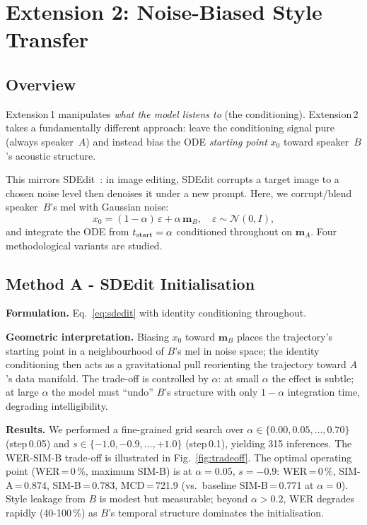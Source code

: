 \documentclass[11pt,a4paper,twocolumn]{article}
\begin{document}
\section{Extension 2: Noise-Biased Style Transfer}
\label{sec:ext2}

\subsection{Overview}

Extension\,1 manipulates \emph{what the model listens to} (the conditioning).
Extension\,2 takes a fundamentally different approach: leave the conditioning
signal pure (always speaker~$A$) and instead bias the ODE \emph{starting
point} $x_0$ toward speaker~$B$'s acoustic structure.

This mirrors SDEdit~\cite{song2022sdedit}: in image editing, SDEdit corrupts
a target image to a chosen noise level then denoises it under a new prompt.
Here, we corrupt/blend speaker~$B$'s mel with Gaussian noise:
\begin{equation}
  x_0 = (1-\alpha)\,\varepsilon + \alpha\,\mathbf{m}_B,
  \quad \varepsilon\sim\mathcal{N}(0,I),
  \label{eq:sdedit}
\end{equation}
and integrate the ODE from $t_{\rm start}=\alpha$ conditioned throughout
on $\mathbf{m}_A$.  Four methodological variants are studied.

\subsection{Method A - SDEdit Initialisation}

\textbf{Formulation.} Eq.~\eqref{eq:sdedit} with identity conditioning
throughout.

\textbf{Geometric interpretation.}  Biasing $x_0$ toward $\mathbf{m}_B$
places the trajectory's starting point in a neighbourhood of $B$'s mel in
noise space; the identity conditioning then acts as a gravitational pull
reorienting the trajectory toward $A$'s data manifold.  The trade-off is
controlled by $\alpha$: at small $\alpha$ the effect is subtle; at large
$\alpha$ the model must ``undo'' $B$'s structure with only $1-\alpha$
integration time, degrading intelligibility.

\textbf{Results.}  We performed a fine-grained grid search over
$\alpha\in\{0.00, 0.05, \ldots, 0.70\}$ (step\,0.05) and
$s\in\{-1.0, -0.9, \ldots, +1.0\}$ (step\,0.1), yielding 315 inferences.
The WER-SIM-B trade-off is illustrated in Fig.~\ref{fig:tradeoff}.
The optimal operating point (WER\,=\,0\,\%, maximum SIM-B) is at
$\alpha=0.05$, $s=-0.9$: WER\,=\,0\,\%, SIM-A\,=\,0.874, SIM-B\,=\,0.783,
MCD\,=\,721.9 (vs.\ baseline SIM-B\,=\,0.771 at $\alpha=0$).
Style leakage from $B$ is modest but measurable; beyond $\alpha>0.2$,
WER degrades rapidly (40-100\,\%) as $B$'s temporal structure dominates
the initialisation.
\end{document}
